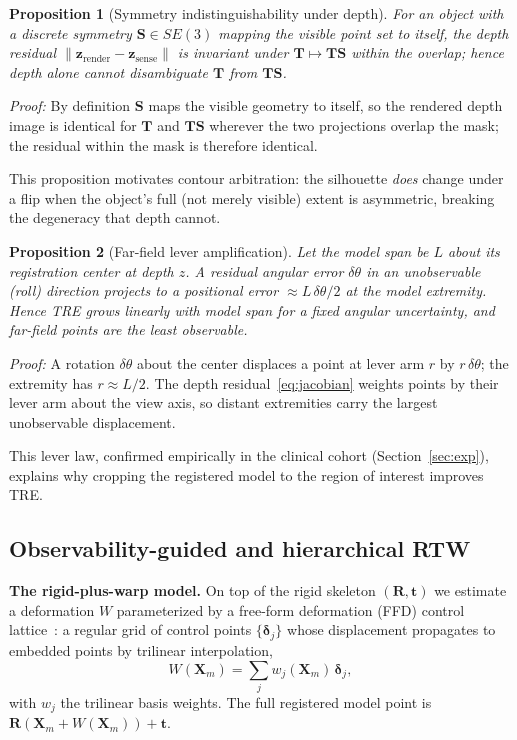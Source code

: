 \documentclass[9pt,twoside,web]{ieeecolor2}
\newtheorem{proposition}{Proposition}
\begin{document}
\begin{proposition}[Symmetry indistinguishability under depth]
For an object with a discrete symmetry $\mathbf{S}\in SE(3)$ mapping the visible point set to itself, the depth residual $\|\mathbf{z}_{\mathrm{render}}-\mathbf{z}_{\mathrm{sense}}\|$ is invariant under $\mathbf{T}\mapsto\mathbf{T}\mathbf{S}$ within the overlap; hence depth alone cannot disambiguate $\mathbf{T}$ from $\mathbf{T}\mathbf{S}$.
\end{proposition}
\noindent\textit{Proof:}
By definition $\mathbf{S}$ maps the visible geometry to itself, so the rendered depth image is identical for $\mathbf{T}$ and $\mathbf{T}\mathbf{S}$ wherever the two projections overlap the mask; the residual within the mask is therefore identical.

This proposition motivates contour arbitration: the silhouette \emph{does} change under a flip when the object's full (not merely visible) extent is asymmetric, breaking the degeneracy that depth cannot.

\begin{proposition}[Far-field lever amplification]\label{prop:lever}
Let the model span be $L$ about its registration center at depth $z$. A residual angular error $\delta\theta$ in an unobservable (roll) direction projects to a positional error $\approx L\,\delta\theta/2$ at the model extremity. Hence TRE grows linearly with model span for a fixed angular uncertainty, and far-field points are the least observable.
\end{proposition}
\noindent\textit{Proof:}
A rotation $\delta\theta$ about the center displaces a point at lever arm $r$ by $r\,\delta\theta$; the extremity has $r\approx L/2$. The depth residual~\eqref{eq:jacobian} weights points by their lever arm about the view axis, so distant extremities carry the largest unobservable displacement.

This lever law, confirmed empirically in the clinical cohort (Section~\ref{sec:exp}), explains why cropping the registered model to the region of interest improves TRE.

\subsection{Observability-guided and hierarchical RTW}\label{sec:rtw}

\textbf{The rigid-plus-warp model.} On top of the rigid skeleton $(\mathbf{R},\mathbf{t})$ we estimate a deformation $W$ parameterized by a free-form deformation (FFD) control lattice~\cite{sederberg1986ffd}: a regular grid of control points $\{\boldsymbol{\delta}_{j}\}$ whose displacement propagates to embedded points by trilinear interpolation,
\begin{equation}\label{eq:ffd}
W(\mathbf{X}_{m}) = \sum_{j} w_{j}(\mathbf{X}_{m})\,\boldsymbol{\delta}_{j},
\end{equation}
with $w_{j}$ the trilinear basis weights. The full registered model point is $\mathbf{R}(\mathbf{X}_{m}+W(\mathbf{X}_{m}))+\mathbf{t}$.
\end{document}
